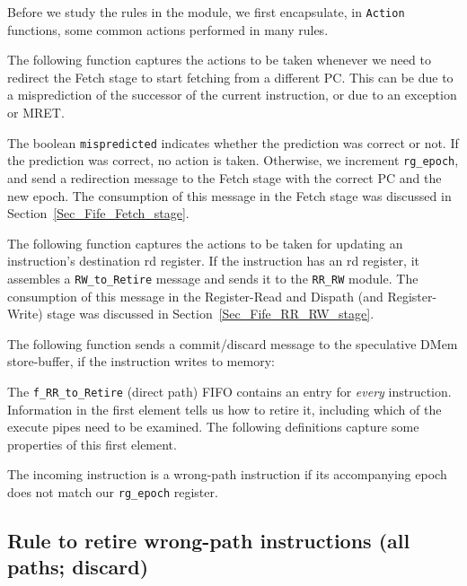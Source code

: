 Before we study the rules in the module, we first encapsulate, in
\verb|Action| functions, some common actions performed in many rules.

The following function captures the actions to be taken whenever we
need to redirect the Fetch stage to start fetching from a different
PC.  This can be due to a misprediction of the successor of the
current instruction, or due to an exception or MRET.



The boolean \verb|mispredicted| indicates whether the prediction was
correct or not.  If the prediction was correct, no action is taken.
Otherwise, we increment \verb|rg_epoch|, and send a redirection
message to the Fetch stage with the correct PC and the new epoch.  The
consumption of this message in the Fetch stage was discussed in
Section~\ref{Sec_Fife_Fetch_stage}.

The following function captures the actions to be taken for updating
an instruction's destination rd register. If the instruction has an rd
register, it assembles a \verb|RW_to_Retire| message and sends it to
the \verb|RR_RW| module.  The consumption of this message in the
Register-Read and Dispath (and Register-Write) stage was discussed in
Section~\ref{Sec_Fife_RR_RW_stage}.



The following function sends a commit/discard message to the
speculative DMem store-buffer, if the instruction writes to memory:



The \verb|f_RR_to_Retire| (direct path) FIFO contains an entry for
\emph{every} instruction.  Information in the first element tells us
how to retire it, including which of the execute pipes need to be
examined.  The following definitions capture some properties of this
first element.



The incoming instruction is a wrong-path instruction if its
accompanying epoch does not match our \verb|rg_epoch| register.


\subsection{Rule to retire wrong-path instructions (all paths; discard)}

